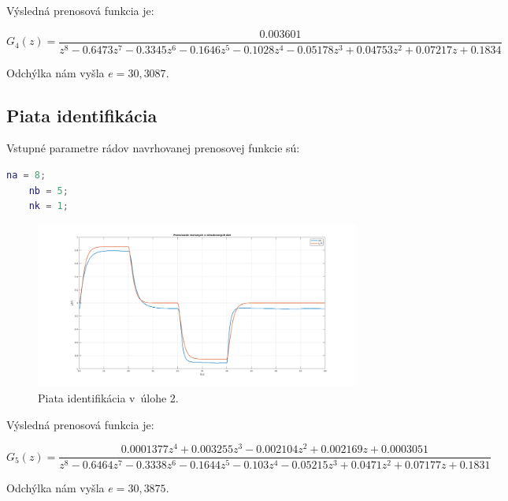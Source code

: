 \documentclass{article}
\begin{document}
Výsledná prenosová funkcia je:

\begin{equation}
	G_4(z) = \frac{0.003601}{z^8 - 0.6473 z^7 - 0.3345 z^6 - 0.1646 z^5 - 0.1028 z^4 - 0.05178 z^3 + 0.04753 z^2 + 0.07217 z + 0.1834}
	\label{eq:I4}
\end{equation}

Odchýlka nám vyšla $e = 30,3087$.

\clearpage

\subsection{Piata identifikácia}
\label{subsec:I5}

Vstupné parametre rádov navrhovanej prenosovej funkcie sú:

\begin{lstlisting}[language=Matlab]
	na = 8;
	nb = 5;
	nk = 1;
\end{lstlisting}

\begin{figure}[!htbp]
	\begin{center}
		\includegraphics[width=0.95\textwidth]{include/I5.png}
	\end{center}
	\caption{Piata identifikácia v~úlohe 2.}
	\label{fig:I5}
\end{figure}

Výsledná prenosová funkcia je:

\begin{equation}
	G_5(z) = \frac{0.0001377 z^4 + 0.003255 z^3 - 0.002104 z^2 + 0.002169 z + 0.0003051}{z^8 - 0.6464 z^7 - 0.3338 z^6 - 0.1644 z^5 - 0.103 z^4 - 0.05215 z^3 + 0.0471 z^2 + 0.07177 z + 0.1831}
	\label{eq:I5}
\end{equation}

Odchýlka nám vyšla $e = 30,3875$.

\clearpage
\end{document}
